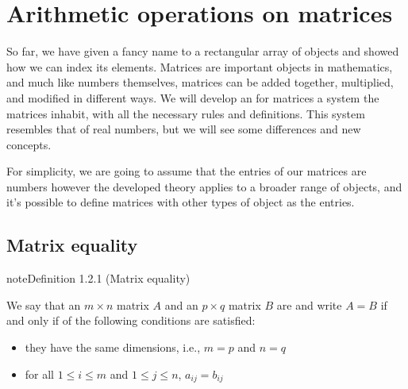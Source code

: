\documentclass[letterpaper,10pt,english]{jupyterBook}
\begin{document}
\sphinxstepscope


\section{Arithmetic operations on matrices}
\label{\detokenize{_pages/1.1_Matrix_operations:arithmetic-operations-on-matrices}}\label{\detokenize{_pages/1.1_Matrix_operations:matrix-operations-section}}\label{\detokenize{_pages/1.1_Matrix_operations::doc}}
\sphinxAtStartPar
So far, we have given a fancy name to a rectangular array of objects and showed how we can index its elements. Matrices are important objects in mathematics, and much like numbers themselves, matrices can be added together, multiplied, and modified in different ways. We will develop an  for matrices \sphinxhyphen{} a system the matrices inhabit, with all the necessary rules and definitions. This system resembles that of real numbers, but we will see some differences and new concepts.

\sphinxAtStartPar
For simplicity, we are going to assume that the entries of our matrices are numbers \sphinxhyphen{} however the developed theory applies to a broader range of objects, and it’s possible to define matrices with other types of object as the entries.

\ignorespaces 

\subsection{Matrix equality}
\label{\detokenize{_pages/1.1_Matrix_operations:matrix-equality}}\label{\detokenize{_pages/1.1_Matrix_operations:index-0}}\label{_pages/1.1_Matrix_operations:matrix-equality-definition}
\begin{sphinxadmonition}{note}{Definition 1.2.1 (Matrix equality)}



\sphinxAtStartPar
We say that an \(m \times n\) matrix \(A\) and an \(p \times q\) matrix \(B\) are  and write \(A = B\) if and only if  of the following conditions are satisfied:
\begin{itemize}
\item {} 
\sphinxAtStartPar
they have the same dimensions, i.e., \(m = p\) and \(n = q\)

\item {} 
\sphinxAtStartPar
for all \(1 \leq i \leq m\) and \(1 \leq j \leq n\), \(a_{ij} = b_{ij}\)

\end{itemize}
\end{sphinxadmonition}
\end{document}
